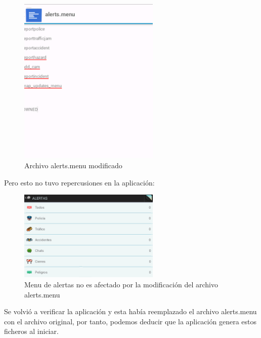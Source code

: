         \begin{figure}[H]
  \begin{center}
    \includegraphics[width=0.6\textwidth]{imagenes/fig41.png}
    \caption{Archivo alerts.menu modificado}
  \end{center}
\end{figure}

Pero esto no tuvo repercusiones en la aplicación:


        \begin{figure}[H]
  \begin{center}
    \includegraphics[width=0.6\textwidth]{imagenes/fig42.png}
    \caption{Menu de alertas no es afectado por la modificación del archivo alerts.menu}
  \end{center}
\end{figure}


Se volvió a verificar la aplicación y esta había reemplazado el archivo alerts.menu con el archivo original, por tanto, podemos deducir que la aplicación genera estos ficheros al iniciar.

